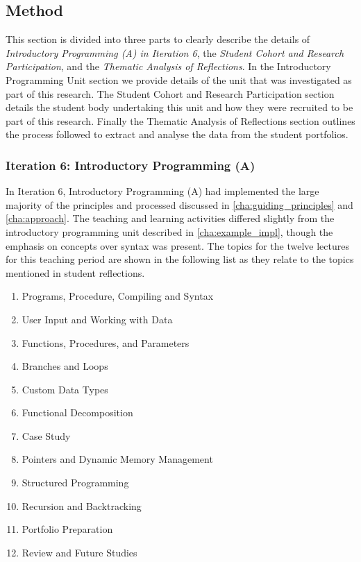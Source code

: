 \subsection{Method} %
\label{sub:issues_method}

This section is divided into three parts to clearly describe the details of \emph{Introductory Programming (A) in Iteration 6}, the \emph{Student Cohort and Research Participation}, and the \emph{Thematic Analysis of Reflections}. In the Introductory Programming Unit section we provide details of the unit that was investigated as part of this research. The Student Cohort and Research Participation section details the student body undertaking this unit and how they were recruited to be part of this research. Finally the Thematic Analysis of Reflections section outlines the process followed to extract and analyse the data from the student portfolios.

\subsubsection{Iteration 6: Introductory Programming (A)} %
\label{sub:intro_prog_i6}

In Iteration 6, Introductory Programming (A) had implemented the large majority of the principles and processed discussed in \cref{cha:guiding_principles} and \cref{cha:approach}. The teaching and learning activities differed slightly from the introductory programming unit described in \cref{cha:example_impl}, though the emphasis on concepts over syntax was present. The topics for the twelve lectures for this teaching period are shown in the following list as they relate to the topics mentioned in student reflections.
\begin{enumerate}
  \item Programs, Procedure, Compiling and Syntax
  \item User Input and Working with Data
  \item Functions, Procedures, and Parameters
  \item Branches and Loops
  \item Custom Data Types
  \item Functional Decomposition
  \item Case Study
  \item Pointers and Dynamic Memory Management
  \item Structured Programming
  \item Recursion and Backtracking
  \item Portfolio Preparation
  \item Review and Future Studies
\end{enumerate}

